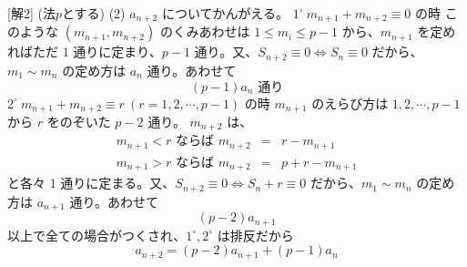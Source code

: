 \documentclass[../main.tex]{subfiles}
\begin{document}
[解2] (法$p$とする)
(2) $a_{n+2}$ についてかんがえる。
$1^\circ\ m_{n+1} + m_{n+2} \equiv 0$ の時
このような $(m_{n+1}, m_{n+2})$ のくみあわせは $1 \le m_i \le p-1$ から、$m_{n+1}$ を定めればただ $1$ 通りに定まり、$p-1$ 通り。又、$S_{n+2} \equiv 0 \iff S_n \equiv 0$ だから、$m_1 \sim m_n$ の定め方は $a_n$ 通り。あわせて
\[ (p-1) a_n \text{ 通り} \]
$2^\circ\ m_{n+1} + m_{n+2} \equiv r\ (r=1, 2, \cdots, p-1)$ の時
$m_{n+1}$ のえらび方は $1, 2, \cdots, p-1$ から $r$ をのぞいた $p-2$ 通り。
$m_{n+2}$ は、
\begin{eqnarray*}
  m_{n+1} < r \text{ ならば } m_{n+2} &=& r - m_{n+1} \\
  m_{n+1} > r \text{ ならば } m_{n+2} &=& p + r - m_{n+1}
\end{eqnarray*}
と各々 $1$ 通りに定まる。又、$S_{n+2} \equiv 0 \iff S_n + r \equiv 0$ だから、$m_1 \sim m_n$ の定め方は $a_{n+1}$ 通り。あわせて
\[ (p-2) a_{n+1} \]
以上で全ての場合がつくされ、$1^\circ, 2^\circ$ は排反だから
\[ a_{n+2} = (p-2)a_{n+1} + (p-1)a_n \]
\end{document}
